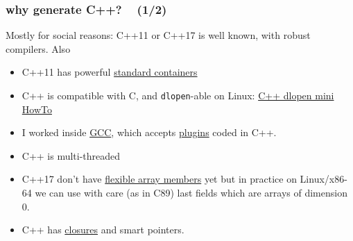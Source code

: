 \documentclass[xcolor=svgnames,final,smaller,a4]{beamer}
\begin{document}
  \begin{frame}
    \frametitle{why generate C++? ~ (1/2)}

    Mostly for social reasons: C++11 or C++17 is well known, with robust compilers. Also
    \begin{itemize}
    \item C++11 has powerful \href{https://en.cppreference.com/w/cpp/container}{standard containers}
    \item C++ is compatible with C, and \texttt{dlopen}-able on
      Linux: \href{https://www.tldp.org/HOWTO/html_single/C++-dlopen/}{C++
        dlopen mini HowTo}
      \item I worked inside \href{http://gcc.gnu.org/}{GCC}, which
        accepts
        \href{https://gcc.gnu.org/onlinedocs/gccint/Plugins.html}{plugins}
        coded in C++.
      \item C++ is multi-threaded
      \item C++17 don't have
        \href{https://en.wikipedia.org/wiki/Flexible_array_member}{flexible
          array members} yet but in practice on Linux/x86-64 we can use
        with care (as in C89) last fields which are arrays of dimension
        0.
      \item C++ has \href{https://en.cppreference.com/w/cpp/language/lambda}{closures} and smart pointers.
    \end{itemize}

  \end{frame}
\end{document}
